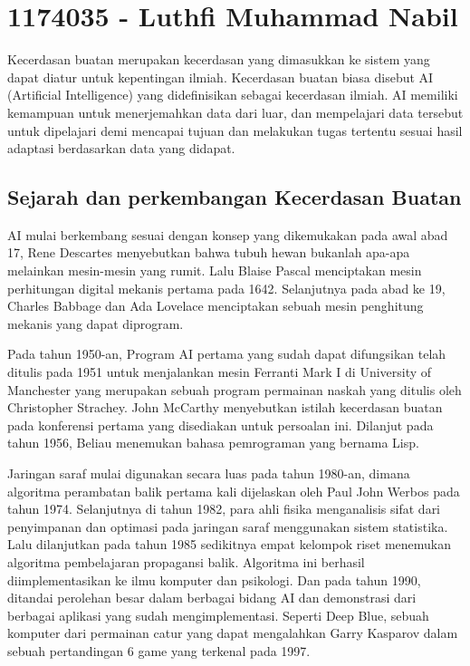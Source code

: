 \section{1174035 - Luthfi Muhammad Nabil}
Kecerdasan buatan merupakan kecerdasan yang dimasukkan ke sistem yang dapat diatur untuk kepentingan ilmiah. Kecerdasan buatan biasa disebut AI (Artificial Intelligence) yang didefinisikan sebagai kecerdasan ilmiah. AI memiliki kemampuan untuk menerjemahkan data dari luar, dan mempelajari data tersebut untuk dipelajari demi mencapai tujuan dan melakukan tugas tertentu sesuai hasil adaptasi berdasarkan data yang didapat. 


\subsection{Sejarah dan perkembangan Kecerdasan Buatan}
AI mulai berkembang sesuai dengan konsep yang dikemukakan pada awal abad 17, Rene Descartes menyebutkan bahwa tubuh hewan bukanlah apa-apa melainkan mesin-mesin yang rumit. Lalu Blaise Pascal menciptakan mesin perhitungan digital mekanis pertama pada 1642. Selanjutnya pada abad ke 19, Charles Babbage dan Ada Lovelace menciptakan sebuah mesin penghitung mekanis yang dapat diprogram.

Pada tahun 1950-an, Program AI pertama yang sudah dapat difungsikan telah ditulis pada 1951 untuk menjalankan mesin Ferranti Mark I di University of Manchester yang merupakan sebuah program permainan naskah yang ditulis oleh Christopher Strachey. John McCarthy menyebutkan istilah kecerdasan buatan pada konferensi pertama yang disediakan untuk persoalan ini. Dilanjut pada tahun 1956, Beliau menemukan bahasa pemrograman yang bernama Lisp.

Jaringan saraf mulai digunakan secara luas pada tahun 1980-an, dimana algoritma perambatan balik pertama kali dijelaskan oleh Paul John Werbos pada tahun 1974. Selanjutnya di tahun 1982, para ahli fisika menganalisis sifat dari penyimpanan dan optimasi pada jaringan saraf menggunakan sistem statistika. Lalu dilanjutkan pada tahun 1985 sedikitnya empat kelompok riset menemukan algoritma pembelajaran propagansi balik. Algoritma ini berhasil diimplementasikan ke ilmu komputer dan psikologi. Dan pada tahun 1990, ditandai perolehan besar dalam berbagai bidang AI dan demonstrasi dari berbagai aplikasi yang sudah mengimplementasi. Seperti Deep Blue, sebuah komputer dari permainan catur yang dapat mengalahkan Garry Kasparov dalam sebuah pertandingan 6 game yang terkenal pada 1997. 

